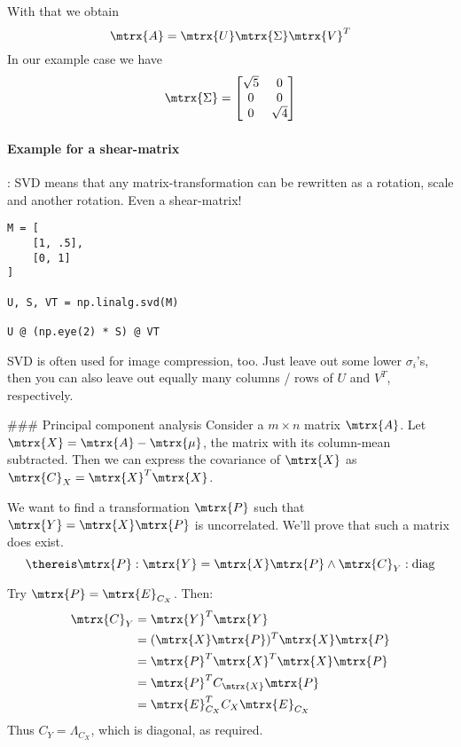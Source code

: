 With that we obtain
\begin{equation}
    \mtrx{A} = \mtrx{U} \mtrx{\Sigma} \mtrx{V}^T
\end{equation}
In our example case we have 
$$
    \mtrx{\Sigma} = \begin{bmatrix}
        \sqrt{5} & 0 \\
        0        & 0 \\
        0        & \sqrt{4}
    \end{bmatrix}
$$




\paragraph{Example for a shear-matrix}: SVD means that any matrix-transformation can be rewritten as a rotation, scale and another rotation. Even a shear-matrix!
\begin{lstlisting}
M = [
    [1, .5],
    [0, 1]
]

U, S, VT = np.linalg.svd(M)

U @ (np.eye(2) * S) @ VT
\end{lstlisting}
SVD is often used for image compression, too. Just leave out some lower $\sigma_i$'s, then you can also leave out equally many columns / rows of $U$ and $V^T$, respectively.


### Principal component analysis
Consider a $m \times n$ matrix $\mtrx{A}$. Let $\mtrx{X} = \mtrx{A} - \mtrx{\mu}$, the matrix with its column-mean subtracted.
Then we can express the covariance of $\mtrx{X}$ as $\mtrx{C}_X = \mtrx{X}^T \mtrx{X}$.

We want to find a transformation $\mtrx{P}$ such that $\mtrx{Y} = \mtrx{X} \mtrx{P}$ is uncorrelated. We'll prove that such a matrix does exist.
\begin{equation}
    \thereis \mtrx{P}: \mtrx{Y} = \mtrx{X} \mtrx{P} \land \mtrx{C}_Y: \text{diag}
\end{equation}

Try $\mtrx{P} = \mtrx{E}_{C_X}$. Then:
\begin{equation}
    \begin{aligned}
        \mtrx{C}_Y  &= \mtrx{Y}^T \mtrx{Y} \\
                    &= (\mtrx{X} \mtrx{P})^T \mtrx{X} \mtrx{P} \\
                    &= \mtrx{P}^T \mtrx{X}^T \mtrx{X} \mtrx{P} \\
                    &= \mtrx{P}^T C_\mtrx{X} \mtrx{P} \\
                    &= \mtrx{E}_{C_X}^T C_X \mtrx{E}_{C_X}
    \end{aligned}
\end{equation}
Thus $C_Y = \Lambda_{C_X}$, which is diagonal, as required.


